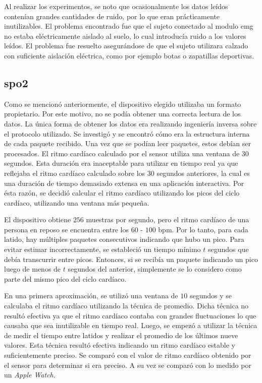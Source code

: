 Al realizar los experimentos, se noto que ocasionalmente los datos leídos contenían grandes cantidades de ruido, por lo que eran prácticamente inutilizables. El problema encontrado fue que el sujeto conectado al modulo \acrshort{emg} no estaba eléctricamente aislado al suelo, lo cual introducía ruido a los valores leídos. El problema fue resuelto asegurándose de que el sujeto utilizara calzado con suficiente aislación eléctrica, como por ejemplo botas o zapatillas deportivas.

\subsection{\acrshort{spo2}} \label{sec:spo2-signal-processing}

Como se mencionó anteriormente, el dispositivo elegido utilizaba un formato propietario. Por este motivo, no se podía obtener una correcta lectura de los datos. La única forma de obtener los datos era realizando ingeniería inversa sobre el protocolo utilizado. Se investigó y se encontró cómo era la estructura interna de cada paquete recibido. Una vez que se podían leer paquetes, estos debían ser procesados. El ritmo cardíaco calculado por el sensor utiliza una ventana de 30 segundos. Esta duración era inaceptable para utilizar en tiempo real ya que reflejaba el ritmo cardíaco calculado sobre los 30 segundos anteriores, la cual es una duración de tiempo demasiado extensa en una aplicación interactiva. Por ésta razón, se decidió calcular el ritmo cardíaco utilizando los picos del ciclo cardíaco, utilizando una ventana más pequeña.

El dispositivo obtiene $256$ muestras por segundo, pero el ritmo cardíaco de una persona en reposo se encuentra entre los $60$ - $100$ \acrshort{bpm}. Por lo tanto, para cada latido, hay múltiples paquetes consecutivos indicando que hubo un pico. Para evitar estimar incorrectamente, se estableció un tiempo mínimo $t$ segundos que debía transcurrir entre picos. Entonces, si se recibía un paquete indicando un pico luego de menos de $t$ segundos del anterior, simplemente se lo considero como parte del mismo pico del ciclo cardíaco.

En una primera aproximación, se utilizó una ventana de $10$ segundos y se calculaba el ritmo cardíaco utilizando la técnica de promedio. Dicha técnica no resultó efectiva ya que el ritmo cardíaco contaba con grandes fluctuaciones lo que causaba que sea inutilizable en tiempo real. Luego, se empezó a utilizar la técnica de medir el tiempo entre latidos y realizar el promedio de los últimos nueve valores. Esta técnica resultó efectiva indicando un ritmo cardíaco estable y suficientemente preciso. Se comparó con el valor de ritmo cardíaco obtenido por el sensor para determinar si era preciso. A su vez se comparó con lo medido por un \emph{Apple Watch}.

